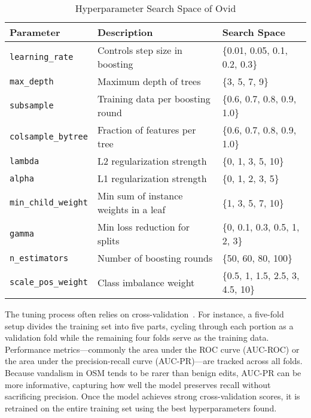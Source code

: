 \documentclass[
    13pt, %
    a4paper, %
    listof=totoc, %
    bibliography=totoc, %
    index=totoc, %
    headsepline
]{scrreprt}
\begin{document}
\begin{table}[htbp]
    \centering
    \caption{Hyperparameter Search Space of Ovid}
    \label{tab:hyperparam_search_space}
    \begin{tabular}{l p{6.5cm} l}
        \toprule
        \textbf{Parameter} & \textbf{Description} & \textbf{Search Space} \\
        \midrule
        \texttt{learning\_rate} & Controls step size in boosting & \{0.01, 0.05, 0.1, 0.2, 0.3\} \\
        \texttt{max\_depth} & Maximum depth of trees & \{3, 5, 7, 9\} \\
        \texttt{subsample} & Training data per boosting round & \{0.6, 0.7, 0.8, 0.9, 1.0\} \\
        \texttt{colsample\_bytree} & Fraction of features per tree & \{0.6, 0.7, 0.8, 0.9, 1.0\} \\
        \texttt{lambda} & L2 regularization strength & \{0, 1, 3, 5, 10\} \\
        \texttt{alpha} & L1 regularization strength & \{0, 1, 2, 3, 5\} \\
        \texttt{min\_child\_weight} & Min sum of instance weights in a leaf & \{1, 3, 5, 7, 10\} \\
        \texttt{gamma} & Min loss reduction for splits & \{0, 0.1, 0.3, 0.5, 1, 2, 3\} \\
        \texttt{n\_estimators} & Number of boosting rounds & \{50, 60, 80, 100\} \\
        \texttt{scale\_pos\_weight} & Class imbalance weight & \{0.5, 1, 1.5, 2.5, 3, 4.5, 10\} \\
        \bottomrule
    \end{tabular}
\end{table}



The tuning process often relies on cross-validation~\cite{sklearn_cross_validation}. For instance, a five-fold setup divides the training set into five parts, cycling through each portion as a validation fold while the remaining four folds serve as the training data. Performance metrics—commonly the area under the ROC curve (AUC-ROC) or the area under the precision-recall curve (AUC-PR)—are tracked across all folds. Because vandalism in OSM tends to be rarer than benign edits, AUC-PR can be more informative, capturing how well the model preserves recall without sacrificing precision. Once the model achieves strong cross-validation scores, it is retrained on the entire training set using the best hyperparameters found.
\end{document}

